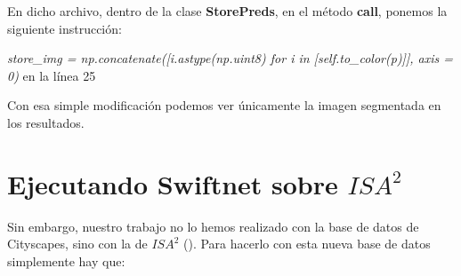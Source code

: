 En dicho archivo, dentro de la clase \textbf{StorePreds}, en el método \textbf{call}, ponemos la siguiente instrucción:

\begin{center}
\textit{store\_img = np.concatenate([i.astype(np.uint8) for i in [self.to\_color(p)]], axis = 0)} en la línea 25
\end{center}

Con esa simple modificación podemos ver únicamente la imagen segmentada en los resultados.

\section{Ejecutando Swiftnet sobre $ISA^{2}$}

Sin embargo, nuestro trabajo no lo hemos realizado con la base de datos de Cityscapes, sino con la de $ISA^{2}$ (\cite{isa2}). Para hacerlo con esta nueva base de datos simplemente hay que:

